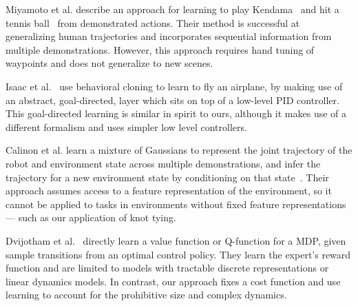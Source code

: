 Miyamoto et al. describe an approach for learning to play Kendama~\cite{Miyamoto_1996} and hit a 
tennis ball~\cite{Miyamoto_1998} from demonstrated actions. 
Their method is successful at generalizing human trajectories and incorporates sequential information 
from multiple demonstrations.
However, this approach requires hand tuning of waypoints and does not generalize to new scenes.

Isaac et al.~\cite{Isaac_ICML2003} use behavioral cloning to learn to fly an airplane, by making use of an abstract, 
goal-directed, layer which sits on top of a low-level PID controller.
This goal-directed learning is similar in spirit to ours, although it makes use of a different formalism
and uses simpler low level controllers.

Calinon et al. learn a mixture of Gaussians to represent the joint trajectory of the robot and environment
state across multiple demonstrations, and infer the trajectory for a new
environment state by conditioning on that state~\cite{Calinon_SMC2007, Calinon_HUM2009}. Their approach
assumes access to a feature representation of the environment, so it cannot be applied to tasks in
environments without fixed feature representations --- such as our application of knot tying.

Dvijotham et al.~\cite{Dvijotham_ICML2010} directly
learn a value function or Q-function for a MDP, given sample transitions
from an optimal control policy. They learn the expert's 
reward function and are limited to models with tractable discrete representations 
or linear dynamics models.
In contrast, our approach fixes a cost function 
and use learning to account for the prohibitive size and
complex dynamics.
